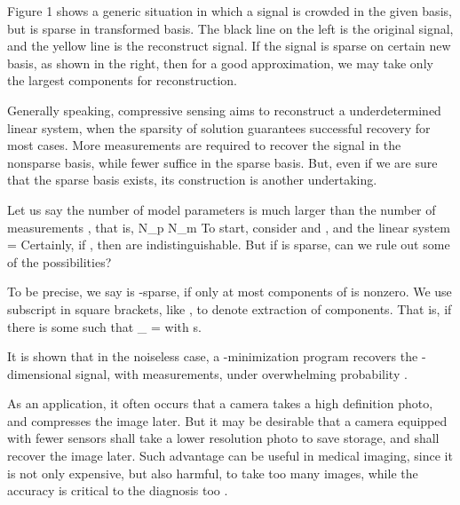 Figure 1 shows a generic situation in which a signal is crowded in the given basis, but is sparse in transformed basis.
The black line on the left is the original signal, and the yellow line is the reconstruct signal.
If the signal is sparse on certain new basis, as shown in the right, then for a good approximation, we may take only the largest components for reconstruction.

Generally speaking, compressive sensing aims to reconstruct a underdetermined linear system, when the sparsity of solution guarantees successful recovery for most cases.
More measurements are required to recover the signal in the nonsparse basis, while fewer suffice in the sparse basis.
But, even if we are sure that the sparse basis exists, its construction is another undertaking.

Let us say the number of model parameters  is much larger than the number of measurements , that is,
%
 {
N_p \gg N_m 
}
%
To start, consider  and , and the linear system
%
 {
=  
}
Certainly, if , then  are indistinguishable.
But if  is sparse, can we rule out some of the possibilities?

To be precise, we say  is -sparse, if only at most  components of  is nonzero.
We use subscript in square brackets, like , to denote extraction of components.
That is, if there is some  such that
%
 {
 _{}
= 
}
%
with
%
 {
 \leq s. 
}

It is shown that in the noiseless case, a -minimization program recovers the -dimensional signal, with  measurements, under overwhelming probability \cite {Can05}.

As an application, it often occurs that a camera takes a high definition photo, and compresses the image later.
But it may be desirable that a camera equipped with fewer sensors shall take a lower resolution photo to save storage, and shall recover the image later.
Such advantage can be useful in medical imaging, since it is not only expensive, but also harmful, to take too many images, while the accuracy is critical to the diagnosis too \cite {CaT07}.


